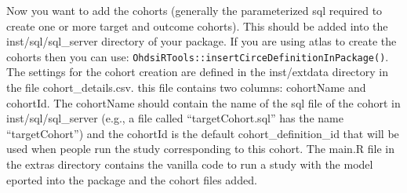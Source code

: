 \documentclass[
]{article}
\begin{document}
Now you want to add the cohorts (generally the parameterized sql
required to create one or more target and outcome cohorts). This should
be added into the inst/sql/sql\_server directory of your package. If you
are using atlas to create the cohorts then you can use:
\texttt{OhdsiRTools::insertCirceDefinitionInPackage()}. The settings for
the cohort creation are defined in the inst/extdata directory in the
file cohort\_details.csv. this file contains two columns: cohortName and
cohortId. The cohortName should contain the name of the sql file of the
cohort in inst/sql/sql\_server (e.g., a file called ``targetCohort.sql''
has the name ``targetCohort'') and the cohortId is the default
cohort\_definition\_id that will be used when people run the study
corresponding to this cohort. The main.R file in the extras directory
contains the vanilla code to run a study with the model eported into the
package and the cohort files added.
\end{document}
